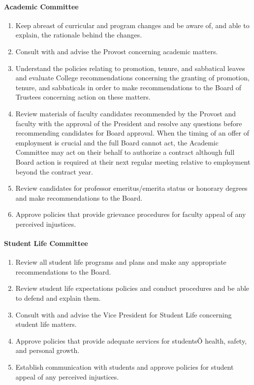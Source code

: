 \documentclass[letterpaper, 11pt]{article}
\begin{document}
			\paragraph{Academic Committee}
				\begin{enumerate}[label=\alph*)]
					\item{Keep abreast of curricular and program changes and be aware of, and able to explain, the rationale behind the changes.}
					\item{Consult with and advise the Provost concerning academic matters.}
					\item{Understand the policies relating to promotion, tenure, and sabbatical leaves and evaluate College recommendations concerning the granting of promotion, tenure, and sabbaticals in order to make recommendations to the Board of Trustees concerning action on these matters.}
					\item{Review materials of faculty candidates recommended by the Provost and faculty with the approval of the President and resolve any questions before recommending candidates for Board approval.  When the timing of an offer of employment is crucial and the full Board cannot act, the Academic Committee may act on their behalf to authorize a contract although full Board action is required at their next regular meeting relative to employment beyond the contract year.}
					\item{Review candidates for professor emeritus/emerita status or honorary degrees and make recommendations to the Board.}
					\item{Approve policies that provide grievance procedures for faculty appeal of any perceived injustices.}
				\end{enumerate}
			\paragraph{Student Life Committee}
				\begin{enumerate}[label=\alph*)]
					\item{Review all student life programs and plans and make any appropriate recommendations to the Board.}
					\item{Review student life expectations policies and conduct procedures and be able to defend and explain them.}
					\item{Consult with and advise the Vice President for Student Life concerning student life matters.}
					\item{Approve policies that provide adequate services for studentsÕ health, safety, and personal growth.}
					\item{Establish communication with students and approve policies for student appeal of any perceived injustices.}
				\end{enumerate}
\end{document}
